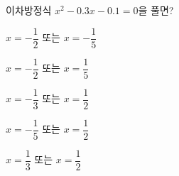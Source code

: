 이차방정식 $x^2-0.3x-0.1=0$을 풀면?
\begin{choicesv}{\rule[-3ex]{0pt}{8ex}$x=-\dfrac{1}{2}$ 또는 $x=-\dfrac{1}{5}$}{\rule[-3ex]{0pt}{8ex}$x=-\dfrac{1}{2}$ 또는 $x=\dfrac{1}{5}$}{\rule[-3ex]{0pt}{8ex}$x=-\dfrac{1}{3}$ 또는 $x=\dfrac{1}{2}$}{\rule[-3ex]{0pt}{8ex}$x=-\dfrac{1}{5}$ 또는 $x=\dfrac{1}{2}$}{\rule[-3ex]{0pt}{8ex}$x=\dfrac{1}{3}$ 또는 $x=\dfrac{1}{2}$}\end{choicesv}
